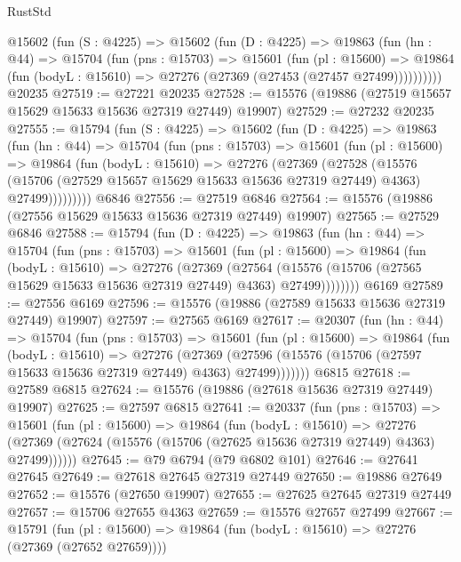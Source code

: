 \begin{lexlean}{RustStd}
\begin{coremodule}
    @15602
      (fun (S : @4225) =>
      @15602
        (fun (D : @4225) =>
        @19863
          (fun (hn : @44) =>
          @15704
            (fun (pns : @15703) =>
            @15601
              (fun (pl : @15600) =>
              @19864 (fun (bodyL : @15610) => @27276 (@27369 (@27453 (@27457 @27499))))))))))
    @20235
@27519 := @27221 @20235
@27528 := @15576 (@19886 (@27519 @15657 @15629 @15633 @15636 @27319 @27449) @19907)
@27529 := @27232 @20235
@27555 := @15794
    (fun (S : @4225) =>
    @15602
      (fun (D : @4225) =>
      @19863
        (fun (hn : @44) =>
        @15704
          (fun (pns : @15703) =>
          @15601
            (fun (pl : @15600) =>
            @19864
              (fun (bodyL : @15610) =>
              @27276
                (@27369
                  (@27528
                    (@15576
                      (@15706 (@27529 @15657 @15629 @15633 @15636 @27319 @27449) @4363)
                      @27499)))))))))
    @6846
@27556 := @27519 @6846
@27564 := @15576 (@19886 (@27556 @15629 @15633 @15636 @27319 @27449) @19907)
@27565 := @27529 @6846
@27588 := @15794
    (fun (D : @4225) =>
    @19863
      (fun (hn : @44) =>
      @15704
        (fun (pns : @15703) =>
        @15601
          (fun (pl : @15600) =>
          @19864
            (fun (bodyL : @15610) =>
            @27276
              (@27369
                (@27564
                  (@15576 (@15706 (@27565 @15629 @15633 @15636 @27319 @27449) @4363) @27499))))))))
    @6169
@27589 := @27556 @6169
@27596 := @15576 (@19886 (@27589 @15633 @15636 @27319 @27449) @19907)
@27597 := @27565 @6169
@27617 := @20307
    (fun (hn : @44) =>
    @15704
      (fun (pns : @15703) =>
      @15601
        (fun (pl : @15600) =>
        @19864
          (fun (bodyL : @15610) =>
          @27276
            (@27369
              (@27596 (@15576 (@15706 (@27597 @15633 @15636 @27319 @27449) @4363) @27499)))))))
    @6815
@27618 := @27589 @6815
@27624 := @15576 (@19886 (@27618 @15636 @27319 @27449) @19907)
@27625 := @27597 @6815
@27641 := @20337
    (fun (pns : @15703) =>
    @15601
      (fun (pl : @15600) =>
      @19864
        (fun (bodyL : @15610) =>
        @27276 (@27369 (@27624 (@15576 (@15706 (@27625 @15636 @27319 @27449) @4363) @27499))))))
@27645 := @79 @6794 (@79 @6802 @101)
@27646 := @27641 @27645
@27649 := @27618 @27645 @27319 @27449
@27650 := @19886 @27649
@27652 := @15576 (@27650 @19907)
@27655 := @27625 @27645 @27319 @27449
@27657 := @15706 @27655 @4363
@27659 := @15576 @27657 @27499
@27667 := @15791
    (fun (pl : @15600) => @19864 (fun (bodyL : @15610) => @27276 (@27369 (@27652 @27659))))

\end{coremodule}
\end{lexlean}
